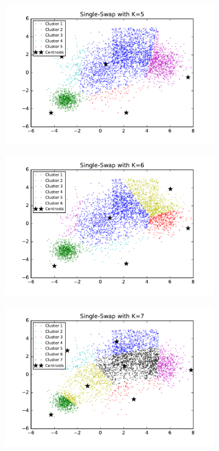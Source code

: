 \begin{description}
\begin{description}
\begin{figure}[!h]
\begin{subfigure}[b]{0.475\textwidth}
            \includegraphics[width=\textwidth]{./figures/bigClustering_singleSwap_5.pdf}
        \end{subfigure}
        \hfill
        \begin{subfigure}[b]{0.475\textwidth}   
            \centering 
            \includegraphics[width=\textwidth]{./figures/bigClustering_singleSwap_6.pdf}
        \end{subfigure}
        \begin{subfigure}[b]{0.475\textwidth}   
            \centering 
            \includegraphics[width=\textwidth]{./figures/bigClustering_singleSwap_7.pdf}

\end{subfigure}
\end{figure}
\end{description}
\end{description}
